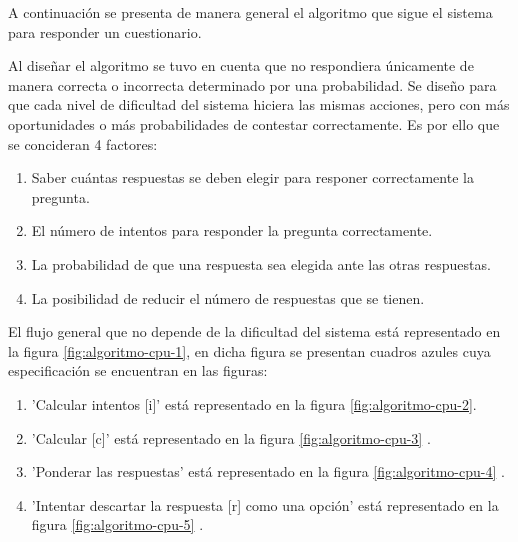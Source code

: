 

A continuación se presenta de manera general el algoritmo que sigue el
sistema para responder un cuestionario.

\noindent Al diseñar el algoritmo se tuvo en cuenta que no respondiera únicamente 
de manera correcta o incorrecta determinado por una probabilidad.
Se diseño para que cada nivel de dificultad del sistema hiciera las mismas acciones, 
pero con más oportunidades o más probabilidades de contestar correctamente. 
Es por ello que se concideran 4 factores:

\begin{enumerate}
    \item Saber cuántas respuestas se deben elegir para responer correctamente la pregunta.
    \item El número de intentos para responder la pregunta correctamente.
    \item La probabilidad de que una respuesta sea elegida ante las otras respuestas.
    \item La posibilidad de reducir el número de respuestas que se tienen.
\end{enumerate}

El flujo general que no depende de la dificultad del sistema está representado en la figura \ref{fig:algoritmo-cpu-1},
en dicha figura se presentan cuadros azules cuya especificación se encuentran en las figuras:


\begin{enumerate}
    \item 'Calcular intentos [i]' está representado en la figura \ref{fig:algoritmo-cpu-2}.
    \item 'Calcular [c]' está representado en la figura \ref{fig:algoritmo-cpu-3} .
    \item 'Ponderar las respuestas' está representado en la figura \ref{fig:algoritmo-cpu-4} .
    \item 'Intentar descartar la respuesta [r] como una opción' está representado en la figura \ref{fig:algoritmo-cpu-5} .
\end{enumerate}

\clearpage

\clearpage
    

